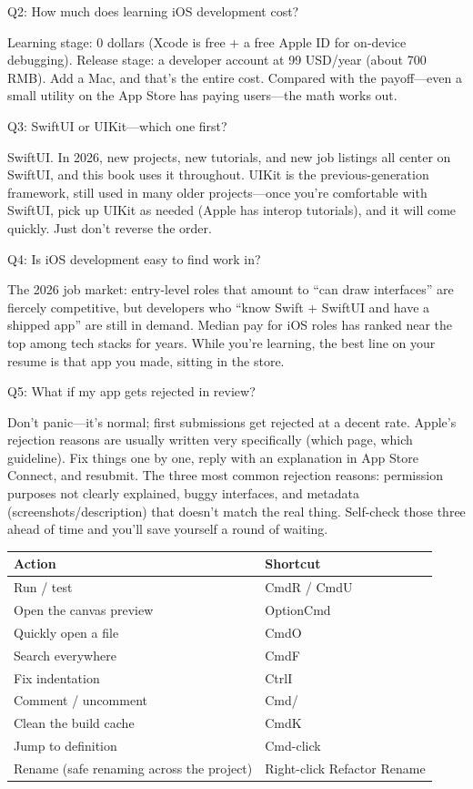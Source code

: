 Q2: How much does learning iOS development cost?

Learning stage: 0 dollars (Xcode is free + a free Apple ID for on-device debugging). Release stage: a developer account at 99 USD/year (about 700 RMB). Add a Mac, and that's the entire cost. Compared with the payoff—even a small utility on the App Store has paying users—the math works out.

Q3: SwiftUI or UIKit—which one first?

SwiftUI. In 2026, new projects, new tutorials, and new job listings all center on SwiftUI, and this book uses it throughout. UIKit is the previous-generation framework, still used in many older projects—once you're comfortable with SwiftUI, pick up UIKit as needed (Apple has interop tutorials), and it will come quickly. Just don't reverse the order.

Q4: Is iOS development easy to find work in?

The 2026 job market: entry-level roles that amount to “can draw interfaces” are fiercely competitive, but developers who “know Swift + SwiftUI and have a shipped app” are still in demand. Median pay for iOS roles has ranked near the top among tech stacks for years. While you're learning, the best line on your resume is that app you made, sitting in the store.

Q5: What if my app gets rejected in review?

Don't panic—it's normal; first submissions get rejected at a decent rate. Apple's rejection reasons are usually written very specifically (which page, which guideline). Fix things one by one, reply with an explanation in App Store Connect, and resubmit. The three most common rejection reasons: permission purposes not clearly explained, buggy interfaces, and metadata (screenshots/description) that doesn't match the real thing. Self-check those three ahead of time and you'll save yourself a round of waiting.


\begin{center}
\begin{tabularx}{\linewidth}{|X|X|}
\hline
\textbf{Action} & \textbf{Shortcut} \tabularnewline
\hline
Run / test & CmdR / CmdU \tabularnewline
Open the canvas preview & OptionCmd \tabularnewline
Quickly open a file & CmdO \tabularnewline
Search everywhere & CmdF \tabularnewline
Fix indentation & CtrlI \tabularnewline
Comment / uncomment & Cmd/ \tabularnewline
Clean the build cache & CmdK \tabularnewline
Jump to definition & Cmd-click \tabularnewline
Rename (safe renaming across the project) & Right-click Refactor Rename \tabularnewline
\hline
\end{tabularx}
\end{center}

